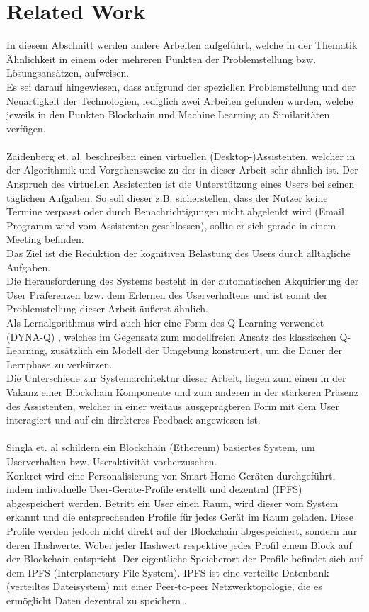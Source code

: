 \section{Related Work}
In diesem Abschnitt werden andere Arbeiten aufgeführt, welche in der Thematik Ähnlichkeit in einem oder mehreren Punkten der Problemstellung bzw. Lösungsansätzen, aufweisen. \\
Es sei darauf hingewiesen, dass aufgrund der speziellen Problemstellung und der Neuartigkeit der Technologien, lediglich zwei Arbeiten gefunden wurden, welche jeweils in den Punkten Blockchain und Machine Learning an Similaritäten verfügen. \\\\
Zaidenberg et. al. \cite{zaidenberg:hal-00788028} beschreiben einen virtuellen (Desktop-)Assistenten, welcher in der Al­go­rith­mik und Vorgehensweise zu der in dieser Arbeit sehr ähnlich ist. Der Anspruch des virtuellen Assistenten ist die Unterstützung eines Users bei seinen täglichen Aufgaben. So soll dieser z.B. sicherstellen, dass der Nutzer keine Termine verpasst oder durch Benachrichtigungen nicht abgelenkt wird (Email Programm wird vom Assistenten geschlossen), sollte er sich gerade in einem Meeting befinden. \\
Das Ziel ist die Reduktion der kognitiven Belastung des Users durch alltägliche Aufgaben. \\
Die Herausforderung des Systems besteht in der automatischen Ak­qui­rie­rung der User Präferenzen bzw. dem Erlernen des Userverhaltens und ist somit der Problemstellung dieser Arbeit äußerst ähnlich.\\
Als Lernalgorithmus wird auch hier eine Form des Q-Learning verwendet (DYNA-Q) \cite{Sutton}, welches im Gegensatz zum modellfreien Ansatz des klassischen Q-Learning, zusätzlich ein Modell der Umgebung konstruiert, um die Dauer der Lernphase zu verkürzen.\\
Die Unterschiede zur Systemarchitektur dieser Arbeit, liegen zum einen in der Vakanz einer Blockchain Komponente und zum anderen in der stärkeren Präsenz des Assistenten, welcher in einer weitaus ausgeprägteren Form mit dem User interagiert und auf ein direkteres Feedback angewiesen ist. \\\\
Singla et. al \cite{Singla:MLSDPUB} schildern ein Blockchain (Ethereum) basiertes System, um Userverhalten bzw. Useraktivität vorherzusehen.\\
Konkret wird eine Personalisierung von Smart Home Geräten durchgeführt, indem individuelle User-Geräte-Profile erstellt und dezentral (IPFS) abgespeichert werden. Betritt ein User einen Raum, wird dieser vom System erkannt und die entsprechenden Profile für jedes Gerät im Raum geladen. Diese Profile werden jedoch nicht direkt auf der Blockchain abgespeichert, sondern nur deren Hashwerte. Wobei jeder Hashwert respektive jedes Profil einem Block auf der Blockchain entspricht. Der eigentliche Speicherort der Profile befindet sich auf dem IPFS (Interplanetary File System). IPFS ist eine verteilte Datenbank (verteiltes Dateisystem) mit einer Peer-to-peer Netzwerktopologie, die es ermöglicht Daten dezentral zu speichern \cite{IPFSIO, IPFSWP}.\\
